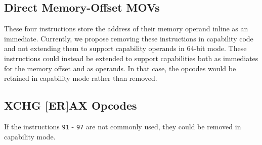 \subsection{Direct Memory-Offset MOVs}

These four  instructions store the address of their
memory operand inline as an immediate.  Currently, we propose
removing these instructions in capability code and not extending
them to support capability operands in 64-bit mode.  These instructions could instead
be extended to support capabilities both as immediates for the memory
offset and as operands.  In that case, the opcodes would be retained
in capability mode rather than removed.

\subsection{XCHG [ER]AX Opcodes}

If the  instructions \texttt{91} - \texttt{97} are not
commonly used, they could be removed in capability mode.
